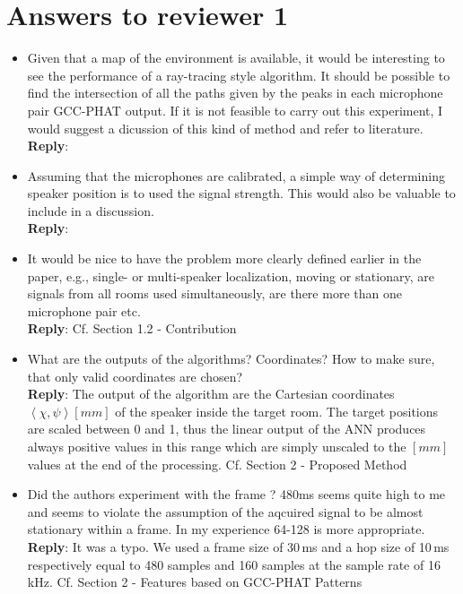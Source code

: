 \documentclass[11pt, technote, letterpaper, oneside, onecolumn]{IEEEtran}
\begin{document}
\section{Answers to reviewer 1}\label{sec:rev1}
\begin{itemize}
\item Given that a map of the environment is available, it would be interesting to see the performance of a ray-tracing style algorithm. It should be possible to find the intersection of all the paths given by the peaks in each microphone pair GCC-PHAT output. If it is not feasible to carry out this experiment, I would suggest a dicussion of this kind of method and refer to literature.\\
\textbf{Reply}:

\item Assuming that the microphones are calibrated, a simple way of determining speaker position is to used the signal strength. This would also be valuable to include in a discussion.\\
\textbf{Reply}:

\item It would be nice to have the problem more clearly defined earlier in the paper, e.g., single- or multi-speaker localization, moving or stationary, are signals from all rooms used simultaneously, are there more than one microphone pair etc.\\
\textbf{Reply}: Cf. Section 1.2 - Contribution 

\item What are the outputs of the algorithms? Coordinates? How to make sure, that only valid coordinates are chosen?\\
\textbf{Reply}: The output of the algorithm are the Cartesian coordinates $\left \langle \chi,\psi \right \rangle \left [mm\right ]$ of the speaker inside the target room. The target positions are scaled between 0 and 1, thus the linear output of the ANN produces always positive values in this range which are simply unscaled to the $\left [mm\right ]$ values at the end of the processing. Cf. Section 2 - Proposed Method

\item Did the authors experiment with the frame ? 480ms seems quite high to me and seems to violate the assumption of the aqcuired signal to be almost stationary within a frame. In my experience 64-128 is more appropriate.\\
\textbf{Reply}: It was a typo. We used a frame size of 30\,ms and a hop size of 10\,ms respectively equal to 480 samples and 160 samples at the sample rate of 16\,kHz. Cf. Section 2 - Features based on GCC-PHAT Patterns


\end{itemize}
\end{document}
